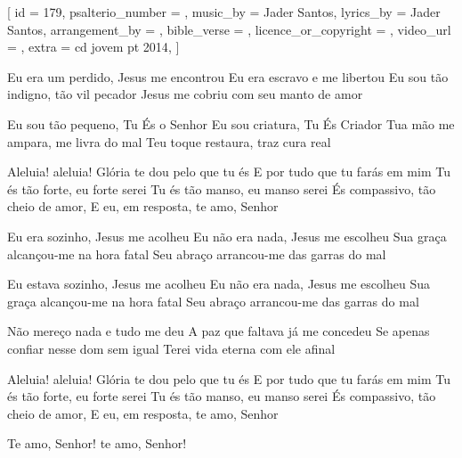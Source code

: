 [
    id                     = {179},
    psalterio_number       = {},
    music_by               = {Jader Santos},
    lyrics_by              = {Jader Santos},
    arrangement_by         = {},
    bible_verse            = {},
    licence_or_copyright   = {},
    video_url              = {},
    extra                  = {cd jovem pt 2014},
]

\beginverse
Eu era um perdido, Jesus me encontrou
Eu era escravo e me libertou
Eu sou tão indigno, tão vil pecador
Jesus me cobriu com seu manto de amor
\endverse

\beginverse
Eu sou tão pequeno, Tu És o Senhor
Eu sou criatura, Tu És Criador
Tua mão me ampara, me livra do mal
Teu toque restaura, traz cura real
\endverse

\beginchorus
Aleluia! aleluia!
Glória te dou pelo que tu és
E por tudo que tu farás em mim
Tu és tão forte, eu forte serei
Tu és tão manso, eu manso serei
És compassivo, tão cheio de amor,
E eu, em resposta, te amo, Senhor
\endchorus

\beginverse
Eu era sozinho, Jesus me acolheu
Eu não era nada, Jesus me escolheu
Sua graça alcançou-me na hora fatal
Seu abraço arrancou-me das garras do mal
\endverse

\beginverse
Eu estava sozinho, Jesus me acolheu
Eu não era nada, Jesus me escolheu
Sua graça alcançou-me na hora fatal
Seu abraço arrancou-me das garras do mal
\endverse

\beginverse
Não mereço nada e tudo me deu
A paz que faltava já me concedeu
Se apenas confiar nesse dom sem igual
Terei vida eterna com ele afinal
\endverse

\beginchorus
Aleluia! aleluia!
Glória te dou pelo que tu és
E por tudo que tu farás em mim
Tu és tão forte, eu forte serei
Tu és tão manso, eu manso serei
És compassivo, tão cheio de amor,
E eu, em resposta, te amo, Senhor

Te amo, Senhor! te amo, Senhor!
\endchorus



\endsong
